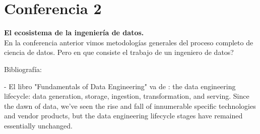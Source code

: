 \documentclass[12pt]{book}
\begin{document}
\chapter{Conferencia 2}
\normalfont\LARGE \textbf{El ecosistema de la ingeniería de datos.}
\normalfont\small\\

En la conferencia anterior vimos metodologías generales del proceso completo de ciencia de datos. Pero en que consiste el trabajo de un ingeniero de datos?







Bibliografía: 

- El libro "Fundamentals of Data Engineering" va de : the data engineering lifecycle: data generation, storage, ingestion, transformation, and serving. Since the dawn of data, we’ve seen the rise and fall of innumerable specific technologies and vendor products, but the data engineering lifecycle stages have remained essentially unchanged. 
\end{document}
